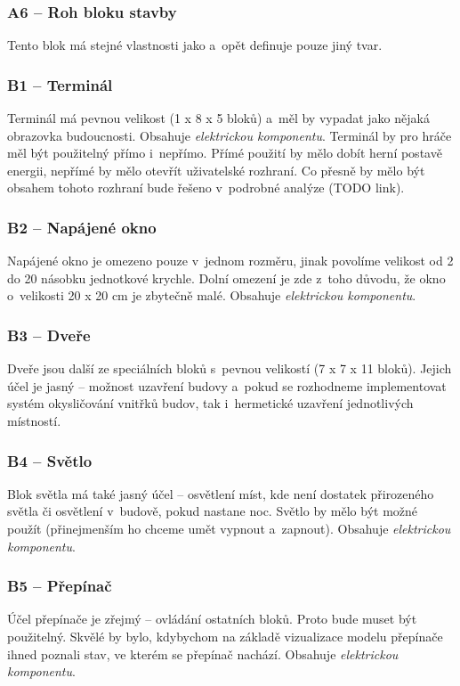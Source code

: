 \subsubsection{A6 -- Roh bloku stavby}
\label{blocks:A6}
Tento blok má stejné vlastnosti jako  a~opět definuje pouze jiný tvar.



\subsubsection{B1 -- Terminál}
\label{blocks:B1}
Terminál má pevnou velikost (1 x 8 x 5 bloků) a~měl by vypadat jako nějaká obrazovka budoucnosti. Obsahuje \textit{elektrickou komponentu}. Terminál by pro hráče měl být použitelný přímo i~nepřímo. Přímé použití by mělo dobít herní postavě energii, nepřímé by mělo otevřít uživatelské rozhraní. Co přesně by mělo být obsahem tohoto rozhraní bude řešeno v~podrobné analýze (TODO link).

\subsubsection{B2 -- Napájené okno}
\label{blocks:B2}
Napájené okno je omezeno pouze v~jednom rozměru, jinak povolíme velikost od 2 do 20 násobku jednotkové krychle. Dolní omezení je zde z~toho důvodu, že okno o~velikosti 20 x 20 cm je zbytečně malé. Obsahuje \textit{elektrickou komponentu}.


\subsubsection{B3 -- Dveře}
\label{blocks:B3}
Dveře jsou další ze speciálních bloků s~pevnou velikostí (7 x 7 x 11 bloků). Jejich účel je jasný -- možnost uzavření budovy a~pokud se rozhodneme implementovat systém okysličování vnitřků budov, tak i~hermetické uzavření jednotlivých místností.


\subsubsection{B4 -- Světlo}
\label{blocks:B4}
Blok světla má také jasný účel -- osvětlení míst, kde není dostatek přirozeného světla či osvětlení v~budově, pokud nastane noc. Světlo by mělo být možné použít (přinejmenším ho chceme umět vypnout a~zapnout). Obsahuje \textit{elektrickou komponentu}. 


\subsubsection{B5 -- Přepínač}
\label{blocks:B5}
Účel přepínače je zřejmý -- ovládání ostatních bloků. Proto bude muset být použitelný. Skvělé by bylo, kdybychom na základě vizualizace modelu přepínače ihned poznali stav, ve kterém se přepínač nachází. Obsahuje \textit{elektrickou komponentu}. 


